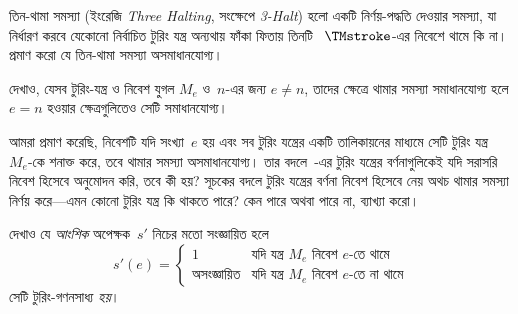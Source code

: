 \documentclass[../../../include/open-logic-section]{subfiles}
\begin{document}
\begin{prob}
তিন-থামা সমস্যা (ইংরেজি \emph{Three Halting}, সংক্ষেপে \emph{3-Halt}) হলো একটি নির্ণয়-পদ্ধতি দেওয়ার সমস্যা, যা
নির্ধারণ করবে যেকোনো নির্বাচিত টুরিং যন্ত্র অন্যথায় ফাঁকা ফিতায় তিনটি
~$\TMstroke$-এর নিবেশে থামে কি না। প্রমাণ করো যে তিন-থামা সমস্যা
অসমাধানযোগ্য।
\end{prob}

\begin{prob}
দেখাও, যেসব টুরিং-যন্ত্র ও নিবেশ যুগল $M_e$ ও~$n$-এর জন্য $e \neq n$,
তাদের ক্ষেত্রে থামার সমস্যা সমাধানযোগ্য হলে $e = n$ হওয়ার ক্ষেত্রগুলিতেও
সেটি সমাধানযোগ্য।
\end{prob}

\begin{prob}
আমরা প্রমাণ করেছি, নিবেশটি যদি সংখ্যা~$e$ হয় এবং সব টুরিং যন্ত্রের একটি
তালিকায়নের মাধ্যমে সেটি টুরিং যন্ত্র~$M_e$-কে শনাক্ত করে, তবে থামার সমস্যা
অসমাধানযোগ্য। তার বদলে~-এর টুরিং যন্ত্রের
বর্ণনাগুলিকেই যদি সরাসরি নিবেশ হিসেবে অনুমোদন করি, তবে কী হয়? সূচকের
বদলে টুরিং যন্ত্রের বর্ণনা নিবেশ হিসেবে নেয় অথচ থামার সমস্যা নির্ণয়
করে—এমন কোনো টুরিং যন্ত্র কি থাকতে পারে? কেন পারে অথবা পারে না, ব্যাখ্যা
করো।
\end{prob}

\begin{prob} দেখাও যে \emph{আংশিক} অপেক্ষক~$s'$ নিচের মতো সংজ্ঞায়িত হলে
  \[
  s'(e) =
  \begin{cases}
    \text{1} & \text{যদি যন্ত্র~$M_e$ নিবেশ $e$-তে থামে}\\
    \text{অসংজ্ঞায়িত} & \text{যদি যন্ত্র~$M_e$ নিবেশ $e$-তে না থামে}
  \end{cases}
  \]
  সেটি টুরিং-গণনসাধ্য \emph{হয়}।
\end{prob}
\end{document}
